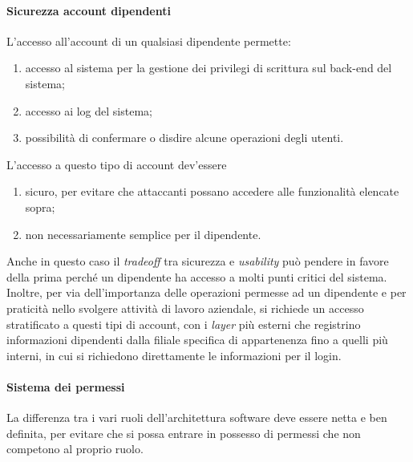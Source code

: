 \paragraph{Sicurezza account dipendenti}
L'accesso all'account di un qualsiasi dipendente permette:
\begin{enumerate}
\item accesso al sistema per la gestione dei privilegi di scrittura sul back-end del sistema;
\item accesso ai log del sistema;
\item possibilità di confermare o disdire alcune operazioni degli utenti.
\end{enumerate}
L'accesso a questo tipo di account dev'essere
\begin{enumerate}
\item sicuro, per evitare che attaccanti possano accedere alle funzionalità elencate sopra;
\item non necessariamente semplice per il dipendente.
\end{enumerate}
Anche in questo caso il \emph{tradeoff} tra sicurezza e \emph{usability} può pendere in favore della prima perch\'e un dipendente ha accesso a molti punti critici del sistema. Inoltre, per via dell'importanza delle operazioni permesse ad un dipendente e per praticità nello svolgere attività di lavoro aziendale, si richiede un accesso stratificato a questi tipi di account, con i \emph{layer} più esterni che registrino informazioni dipendenti dalla filiale specifica di appartenenza fino a quelli più interni, in cui si richiedono direttamente le informazioni per il login.


\paragraph{Sistema dei permessi}
La differenza tra i vari ruoli dell'architettura software deve essere netta e ben definita, per evitare che si possa entrare in possesso di permessi che non competono al proprio ruolo.



